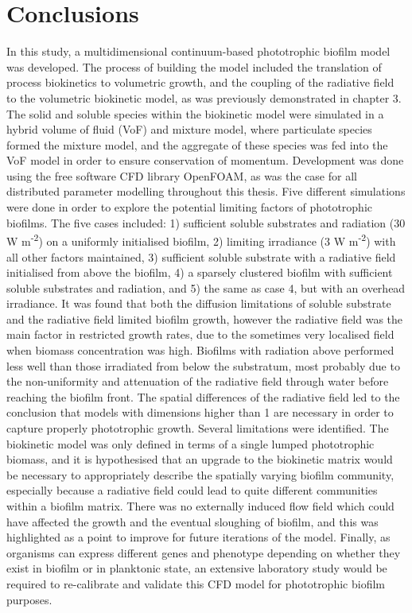 \section{Conclusions}
In this study, a multidimensional continuum-based phototrophic biofilm model was developed. The process of building the model included the translation of process biokinetics to volumetric growth, and the coupling of the radiative field to the volumetric biokinetic model, as was previously demonstrated in chapter 3. The solid and soluble species within the biokinetic model were simulated in a hybrid volume of fluid (VoF) and mixture model, where particulate species formed the mixture model, and the aggregate of these species was fed into the VoF model in order to ensure conservation of momentum. Development was done using the free software CFD library OpenFOAM, as was the case for all distributed parameter modelling throughout this thesis. 
\skippingparagraph
Five different simulations were done in order to explore the potential limiting factors of phototrophic biofilms. The five cases included: 1) sufficient soluble substrates and radiation (30 W m\textsuperscript{-2}) on a uniformly initialised biofilm, 2) limiting irradiance (3 W m\textsuperscript{-2}) with all other factors maintained, 3) sufficient soluble substrate with a radiative field initialised from above the biofilm, 4) a sparsely clustered biofilm with sufficient soluble substrates and radiation, and 5) the same as case 4, but with an overhead irradiance. 
\skippingparagraph
It was found that both the diffusion limitations of soluble substrate and the radiative field limited biofilm growth, however the radiative field was the main factor in restricted growth rates, due to the sometimes very localised field when biomass concentration was high. Biofilms with radiation above performed less well than those irradiated from below the substratum, most probably due to the non-uniformity and attenuation of the radiative field through water before reaching the biofilm front. 
The spatial differences of the radiative field led to the conclusion that models with dimensions higher than 1 are necessary in order to capture properly phototrophic growth.
\skippingparagraph
Several limitations were identified. The biokinetic model was only defined in terms of a single lumped phototrophic biomass, and it is hypothesised that an upgrade to the biokinetic matrix would be necessary to appropriately describe the spatially varying biofilm community, especially because a radiative field could lead to quite different communities within a biofilm matrix. There was no externally induced flow field which could have affected the growth and the eventual sloughing of biofilm, and this was highlighted as a point to improve for future iterations of the model. Finally, as organisms can express different genes and phenotype depending on whether they exist in biofilm or in planktonic state, an extensive laboratory study would be required to re-calibrate and validate this CFD model for phototrophic biofilm purposes.